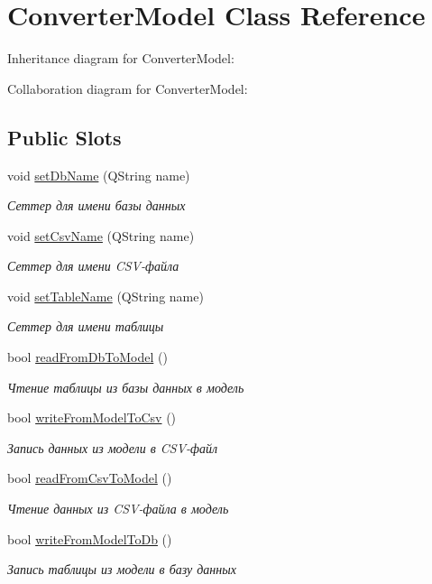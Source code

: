 \hypertarget{classConverterModel}{}\section{Converter\+Model Class Reference}
\label{classConverterModel}


Inheritance diagram for Converter\+Model\+:


Collaboration diagram for Converter\+Model\+:
\subsection*{Public Slots}
\begin{DoxyCompactItemize}
\item 
void \hyperlink{classConverterModel_ad8aa3557fda91e3452359372d506b38c}{set\+Db\+Name} (Q\+String name)
\begin{DoxyCompactList}\small\item\em Сеттер для имени базы данных \end{DoxyCompactList}\item 
void \hyperlink{classConverterModel_afa020aa032cf174958691167be32ef98}{set\+Csv\+Name} (Q\+String name)
\begin{DoxyCompactList}\small\item\em Сеттер для имени C\+S\+V-\/файла \end{DoxyCompactList}\item 
void \hyperlink{classConverterModel_ad4c8232c02f131deb44ddacc9f80d313}{set\+Table\+Name} (Q\+String name)
\begin{DoxyCompactList}\small\item\em Сеттер для имени таблицы \end{DoxyCompactList}\item 
bool \hyperlink{classConverterModel_adae17a2e7799838bd628fac1b4f4b287}{read\+From\+Db\+To\+Model} ()
\begin{DoxyCompactList}\small\item\em Чтение таблицы из базы данных в модель \end{DoxyCompactList}\item 
bool \hyperlink{classConverterModel_a3fee672474b8e81f16f9b368c84fc10a}{write\+From\+Model\+To\+Csv} ()
\begin{DoxyCompactList}\small\item\em Запись данных из модели в C\+S\+V-\/файл \end{DoxyCompactList}\item 
bool \hyperlink{classConverterModel_ae872c32e1f477e31c484ecb9a85cafbb}{read\+From\+Csv\+To\+Model} ()
\begin{DoxyCompactList}\small\item\em Чтение данных из C\+S\+V-\/файла в модель \end{DoxyCompactList}\item 
bool \hyperlink{classConverterModel_a7bc6ea1e321ad26171f24874e5e42717}{write\+From\+Model\+To\+Db} ()
\begin{DoxyCompactList}\small\item\em Запись таблицы из модели в базу данных \end{DoxyCompactList}\end{DoxyCompactItemize}
